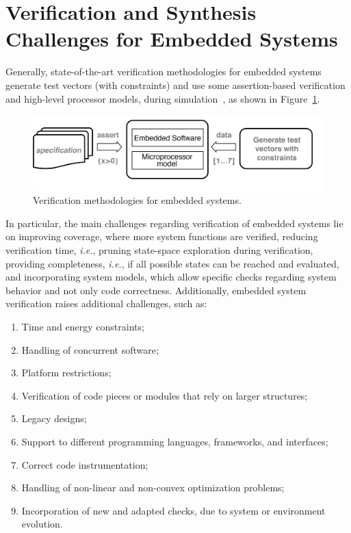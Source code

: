 \documentclass[format=acmsmall, review=false, screen=true]{acmart}
\begin{document}
\section{Verification and Synthesis \\ Challenges for Embedded Systems}
\label{Verification-Challenges} 

Generally, state-of-the-art verification methodologies for embedded systems generate test vectors (with constraints) and use some assertion-based verification and high-level processor models, during simulation~\cite{Behrend15,Lettnin09}, as shown in Figure~\ref{verification-methodologies}. 
%
\begin{figure}[h]
	\centering
	\includegraphics[scale=0.5]{figure4.jpg}
	\caption{Verification methodologies for embedded systems.}
	\label{verification-methodologies}
\end{figure}


In particular, the main challenges regarding verification of embedded systems lie on improving coverage, where more system functions are verified, reducing verification time, {\it i.e.}, pruning state-space exploration during verification, providing completeness, {\it i.e.},  if all possible states can be reached and evaluated, and incorporating system models, which allow specific checks regarding system behavior and not only code correctness. Additionally, embedded system verification raises additional challenges, such as:
%
\begin{enumerate}
	\item Time and energy constraints;
	\item Handling of concurrent software;
	\item Platform restrictions;
	\item Verification of code pieces or modules that rely on larger structures;
	\item Legacy designs; %
	\item Support to different programming languages, frameworks, and interfaces;
	\item Correct code instrumentation;
	\item Handling of non-linear and non-convex optimization problems;
	\item Incorporation of new and adapted checks, due to system or environment evolution.
\end{enumerate}
\end{document}
